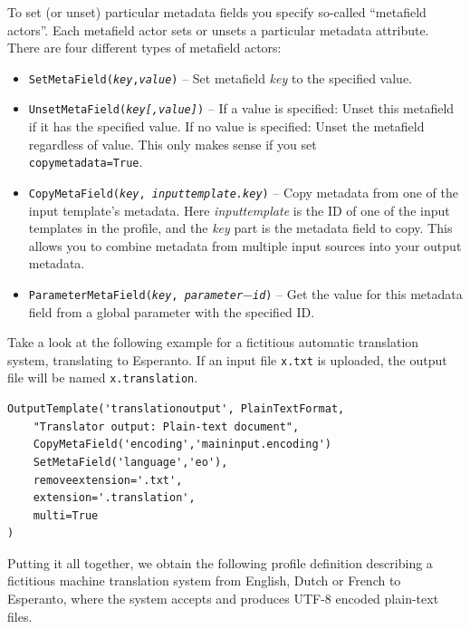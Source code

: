 \documentclass[a4paper,12pt,twoside,openright]{report}
\begin{document}
To set (or unset) particular metadata fields you specify so-called ``metafield
actors''. Each metafield actor sets or unsets a particular metadata attribute.
There are four different types of metafield actors:

\begin{itemize}
\item \texttt{SetMetaField(\emph{key},\emph{value})} -- Set metafield \emph{key} to the specified value.
\item \texttt{UnsetMetaField(\emph{key}\emph{[,value]})} -- If a value is
  specified: Unset this metafield if it has the specified value. If no value is
  specified: Unset the metafield regardless of value. This only makes sense if
  you set \\ \texttt{copymetadata=True}.
\item \texttt{CopyMetaField(\emph{key}, \emph{inputtemplate.key})} -- Copy
  metadata from one of the input template's metadata. Here \emph{inputtemplate}
  is the ID of one of the input templates in the profile, and the \emph{key}
  part is the metadata field to copy. This allows you to combine metadata from
  multiple input sources into your output metadata.
\item \texttt{ParameterMetaField(\emph{key}, \emph{parameter$-$id})} -- Get the value for this metadata field from a global parameter with the specified ID.
\end{itemize}

Take a look at the following example for a fictitious automatic translation
system, translating to Esperanto. If an input file \texttt{x.txt} is uploaded,
the output file will be named \texttt{x.translation}.

{\small
\begin{verbatim}
OutputTemplate('translationoutput', PlainTextFormat,
    "Translator output: Plain-text document",  
    CopyMetaField('encoding','maininput.encoding')
    SetMetaField('language','eo'),
    removeextension='.txt',
    extension='.translation',
    multi=True
)
\end{verbatim}
}

Putting it all together, we obtain the following profile definition describing
a fictitious machine translation system from English, Dutch or French to
Esperanto, where the system accepts and produces UTF-8 encoded plain-text
files.
\end{document}
